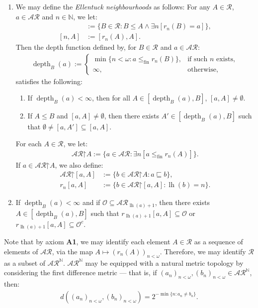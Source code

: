 \documentclass[10pt,a4paper]{amsart}
\theoremstyle{plain}
\numberwithin{equation}{section}
\theoremstyle{definition}
\newcommand{\func}{\operatorname}
\newcommand{\N}{\mathbb{N}}
\newcommand{\cal}{\mathcal}
\newcommand{\restrictedto}{\mathord{\upharpoonright}}
\newcommand{\lh}{\func{lh}}
\renewcommand{\O}{\cal{O}}
\newcommand{\depth}{\func{depth}}
\newcommand{\fin}{\mathrm{fin}}
\begin{document}
\begin{enumerate}
    \item[\textbf{(A3)}] We may define the \emph{Ellentuck neighbourhoods} as follows: For any $A \in \cal{R}$, $a \in \cal{AR}$ and $n \in \N$, we let:
    \begin{align*}
        [a,A] &:= \{B \in \cal{R} : B \leq A \wedge \exists n[r_n(B) = a]\}, \\
        [n,A] &:= [r_n(A),A].
    \end{align*}
    Then the depth function defined by, for $B \in \cal{R}$ and $a \in \cal{AR}$:
    \begin{align*}
        \depth_B(a) := 
        \begin{cases}
            \min\{n < \omega : a \leq_\fin r_n(B)\}, &\text{if such $n$ exists}, \\
            \infty, &\text{otherwise},
        \end{cases}
    \end{align*}
    satisfies the following:
    \begin{enumerate}[label=(\arabic*)]
        \item If $\depth_B(a) < \infty$, then for all $A \in [\depth_B(a),B]$, $[a,A] \neq \emptyset$.

        \item If $A \leq B$ and $[a,A] \neq \emptyset$, then there exists $A' \in [\depth_B(a),B]$ such that $\emptyset \neq [a,A'] \subseteq [a,A]$.
    \end{enumerate}
    For each $A \in \cal{R}$, we let:
    \begin{align*}
        \cal{AR}\restrictedto A := \{a \in \cal{AR} : \exists n[a \leq_\fin r_n(A)]\}.
    \end{align*}
    If $a \in \cal{AR}\restrictedto A$, we also define:
    \begin{align*}
        \cal{AR}\restrictedto[a,A] &:= \{b \in \cal{AR}\restrictedto A : a \sqsubseteq b\}, \\
        r_n[a,A] &:= \{b \in \cal{AR}\restrictedto[a,A] : \lh(b) = n\}.
    \end{align*}

    \item[\textbf{(A4)}] If $\depth_B(a) < \infty$ and if $\O \subseteq \cal{AR}_{\lh(a)+1}$, then there exists $A \in [\depth_B(a),B]$ such that $r_{\lh(a)+1}[a,A] \subseteq \O$ or $r_{\lh(a)+1}[a,A] \subseteq \O^c$.
\end{enumerate}

Note that by axiom \textbf{A1}, we may identify each element $A \in \cal{R}$ as a sequence of elements of $\cal{AR}$, via the map $A \mapsto (r_n(A))_{n<\omega}$. Therefore, we may identify $\cal{R}$ as a subset of $\cal{AR}^\N$. $\cal{AR}^\N$ may be equipped with a natural metric topology by considering the first difference metric --- that is, if $(a_n)_{n<\omega},(b_n)_{n<\omega} \in \cal{AR}^\N$, then:
\begin{align*}
    d((a_n)_{n<\omega},(b_n)_{n<\omega}) = 2^{-\min\{n : a_n \neq b_n\}}.
\end{align*}
\end{document}

